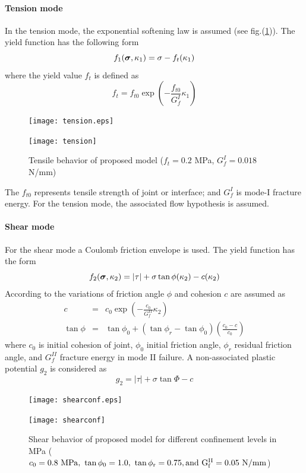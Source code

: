 \documentclass[a4paper]{article}
\newcommand{\mbf}[1]{\mbox{\boldmath$#1$}}
\newcommand{\del}[2]{\mbox{$\displaystyle\frac{#1}{#2}$}}
\newcommand{\sig}{\mbf{\sigma}}
\begin{document}
\paragraph{Tension mode}
In the tension mode, the exponential softening law is assumed (see fig.(\ref{tensfig})). The yield function has the following form
\begin{equation}
  f_1(\sig,\kappa_1) = \sigma-f_t(\kappa_1)
\end{equation}
where the yield value $f_t$ is defined as
\begin{equation}
\label{ft}
  f_t=f_{t0}\exp\left(-\del{f_{t0}}{G^I_f}\kappa_1\right)
\end{equation}
\begin{figure}[!htb]
\begin{htmlonly}
  \centerline{\texttt{[image: tension.eps]}}
\end{htmlonly}
 \centerline{\texttt{[image: tension]}}
  \caption{Tensile behavior of proposed model ($f_t=0.2$ MPa, $G_f^I=0.018$ N/mm)}
  \label{tensfig}
\end{figure}
The $f_{t0}$ represents tensile strength of joint or interface; and $G^I_f$ is mode-I fracture energy. For the tension mode, the associated flow hypothesis is assumed.


\paragraph{Shear mode}
For the shear mode a Coulomb friction envelope is used. The yield function has the form
\begin{equation}
  f_2(\sig,\kappa_2) = \vert\tau\vert+\sigma\tan\phi(\kappa_2)-c(\kappa_2)
\end{equation}
According to \cite{Rots} the variations of friction angle $\phi$ and cohesion $c$ are assumed as
\begin{eqnarray}
  \label{c}
  c&=&c_0\exp\left(-\del{c_0}{G^{II}_f}\kappa_2\right)\\
  \tan\phi&=&\tan\phi_0+(\tan\phi_r-\tan\phi_0)\left(\del{c_0-c}{c_0}\right)
\end{eqnarray}
where $c_0$ is initial cohesion of joint, $\phi_0$ initial friction angle, $\phi_r$ residual friction angle, and $G^{II}_f$ fracture energy in mode II failure. A non-associated plastic potential $g_2$ is considered as
\begin{equation}
  g_2=\vert\tau\vert+\sigma\tan\Phi-c
\end{equation}
\begin{figure}[!htb]
\begin{htmlonly}
  \centerline{\texttt{[image: shearconf.eps]}}
\end{htmlonly}
 \centerline{\texttt{[image: shearconf]}}
  \caption{Shear behavior of proposed model for different confinement levels in MPa ($c_0=0.8\ \rm{MPa},\ \tan\phi_0=1.0,\ \tan\phi_r=0.75,{\rm and}\ G_f^{II}=0.05\ {N/mm}$)}
\end{figure}
\end{document}
